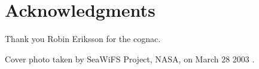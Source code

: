 \section*{Acknowledgments}
Thank you Robin Eriksson for the cognac.

\vspace*{\fill}
Cover photo taken by SeaWiFS Project, NASA, on March 28 2003 \cite{nasaHazeEurope2003}. 